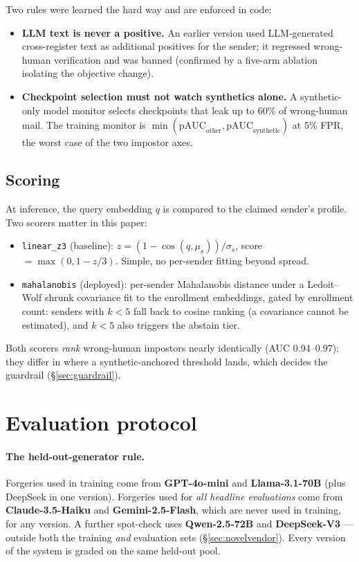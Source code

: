 \documentclass[11pt]{article}
\begin{document}
Two rules were learned the hard way and are enforced in code:
\begin{itemize}[leftmargin=2em]
\item \textbf{LLM text is never a positive.} An earlier version used LLM-generated cross-register
      text as additional positives for the sender; it regressed wrong-human verification and was
      banned (confirmed by a five-arm ablation isolating the objective change).
\item \textbf{Checkpoint selection must not watch synthetics alone.} A synthetic-only model monitor
      selects checkpoints that leak up to 60\% of wrong-human mail. The training monitor is
      $\min(\text{pAUC}_{\mathrm{other}}, \text{pAUC}_{\mathrm{synthetic}})$ at 5\% FPR, the
      worst case of the two impostor axes.
\end{itemize}

\subsection{Scoring}
\label{sec:scoring}
At inference, the query embedding $q$ is compared to the claimed sender's profile. Two scorers
matter in this paper:
\begin{itemize}[leftmargin=2em]
\item \texttt{linear\_z3} (baseline): $z = (1-\cos(q,\mu_s))/\sigma_s$, score
      $=\max(0, 1-z/3)$. Simple, no per-sender fitting beyond spread.
\item \texttt{mahalanobis} (deployed): per-sender Mahalanobis distance under a Ledoit--Wolf
      shrunk covariance \citep{ledoitwolf2004} fit to the enrollment embeddings, gated by
      enrollment count: senders with $k<5$ fall back to cosine ranking (a covariance cannot be
      estimated), and $k<5$ also triggers the abstain tier.
\end{itemize}
Both scorers \emph{rank} wrong-human impostors nearly identically (AUC 0.94--0.97); they differ in
where a synthetic-anchored threshold lands, which decides the guardrail
(\S\ref{sec:guardrail}).

\section{Evaluation protocol}
\label{sec:protocol}

\paragraph{The held-out-generator rule.} Forgeries used in training come from
\textbf{GPT-4o-mini} and \textbf{Llama-3.1-70B} (plus DeepSeek in one version). Forgeries used for
\emph{all headline evaluations} come from \textbf{Claude-3.5-Haiku} and \textbf{Gemini-2.5-Flash},
which are never used in training, for any version. A further spot-check uses
\textbf{Qwen-2.5-72B} and \textbf{DeepSeek-V3} --- outside both the training \emph{and} evaluation
sets (\S\ref{sec:novelvendor}). Every version of the system is graded on the same held-out pool.
\end{document}
